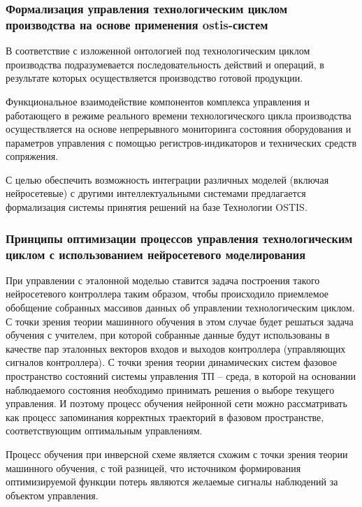 \subsubsection{Формализация управления технологическим циклом производства на основе применения ostis-систем}

В соответствие с изложенной онтологией под технологическим циклом производства подразумевается последовательность действий и операций, в результате которых осуществляется производство готовой продукции.

Функциональное взаимодействие компонентов комплекса управления и работающего в режиме реального времени технологического цикла производства осуществляется на основе непрерывного мониторинга состояния оборудования и параметров управления с помощью регистров-индикаторов и технических средств сопряжения.


С целью обеспечить возможность интеграции различных моделей (включая нейросетевые) с другими интеллектуальными системами предлагается формализация системы принятия решений на базе Технологии OSTIS.





\subsubsection{Принципы оптимизации процессов управления технологическим циклом с использованием нейросетевого моделирования}

При управлении с эталонной моделью ставится задача построения такого нейросетевого контроллера таким образом, чтобы происходило приемлемое обобщение собранных массивов данных об управлении технологическим циклом. С точки зрения теории машинного обучения в этом случае будет решаться задача обучения с учителем, при которой собранные данные будут использованы в качестве пар эталонных векторов входов и выходов контроллера (управляющих сигналов контроллера). С точки зрения теории динамических систем фазовое пространство состояний системы управления ТП – среда, в которой на основании наблюдаемого состояния необходимо принимать решения о выборе текущего управления. И поэтому процесс обучения нейронной сети можно рассматривать как процесс запоминания корректных траекторий в фазовом пространстве, соответствующим оптимальным управлениям. 



Процесс обучения при инверсной схеме является схожим с точки зрения теории машинного обучения, с той разницей, что источником формирования оптимизируемой функции потерь являются желаемые сигналы наблюдений за объектом управления.

